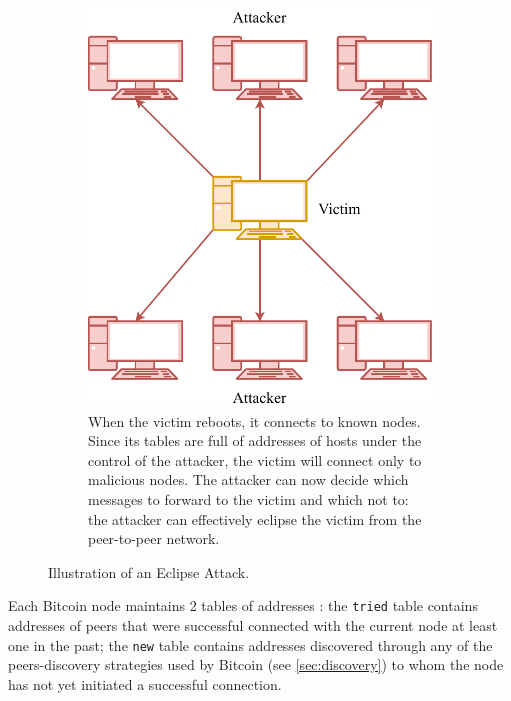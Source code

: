 \begin{figure}[h!]
\begin{subfigure}{.45\textwidth}
{		}
	\end{subfigure}
	\hfill
	\begin{subfigure}{.45\textwidth}
		\vspace*{0.25cm}
		\includegraphics[width=\columnwidth]{figures/eclipse_2}
		\vspace*{0.1cm}
		\caption{
			When the victim reboots, it connects to known nodes.
			Since its tables are full of addresses of hosts under the control of the attacker, the victim will connect only to malicious nodes.
			The attacker can now decide which messages to forward to the victim and which not to:
			the attacker can effectively eclipse the victim from the peer-to-peer network.
		}
	\end{subfigure}
	\caption{Illustration of an Eclipse Attack.}
	\label{fig:eclipse}
\end{figure}

\bigskip
Each Bitcoin node maintains \num{2} tables of addresses \cite{eclipse_attack_2015}:
the \texttt{tried} table contains addresses of peers that were successful connected with the current node at least one in the past;
the \texttt{new} table contains addresses discovered through any of the peers-discovery strategies used by Bitcoin (see \cref{sec:discovery}) to whom the node has not yet initiated a successful connection.

